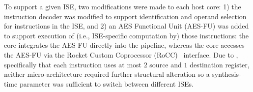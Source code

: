 \noindent
To support a given ISE, two modifications were made to each host core:
1) the instruction decoder was modified to support identification and 
   operand selection for instructions in the ISE,
   and
2) an AES Functional Unit (AES-FU) was added to support execution of
   (i.e., ISE-specific computation by) those instructions:
   the  core integrates the AES-FU directly into the pipeline,
   whereas
   the  core accesses   the AES-FU via the
   Rocket Custom Coprocessor (RoCC)~\cite[Section 4]{rocket:16}
   interface.
Due to , 
specifically that each instruction uses at most $2$ source and $1$ destination register, 
neither micro-architecture required further structural alteration so
a synthesis-time parameter was sufficient to switch between different 
ISEs.

